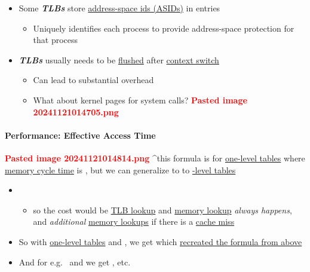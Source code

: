 \begin{itemize}
\tightlist
\item
  Some \textbf{\textit{TLBs}} store \ul{address-space ids (ASIDs)} in
  entries

  \begin{itemize}
  \tightlist
  \item
    Uniquely identifies each process to provide address-space protection
    for that process
  \end{itemize}
\item
  \textbf{\textit{TLBs}} usually needs to be \ul{flushed} after
  \ul{context switch}

  \begin{itemize}
  \tightlist
  \item
    Can lead to substantial overhead
  \item
    What about kernel pages for system calls?
    \textcolor{red}{\textbf{Pasted image 20241121014705.png}}
  \end{itemize}
\end{itemize}

\paragraph*{Performance: Effective Access Time}

\textcolor{red}{\textbf{Pasted image 20241121014814.png}} \^{}this
formula is for \ul{one-level tables} where \ul{memory cycle time}
 is , but we can generalize to to
\ul{-level tables}

\begin{itemize}
\tightlist
\item

  \begin{itemize}
  \tightlist
  \item
    so the cost would be  \ul{TLB lookup} and 
    \ul{memory lookup} \textit{always happens}, and 
    \textit{additional} \ul{memory lookups} if there is a \ul{cache
    miss}
  \end{itemize}
\item
  So with \ul{one-level tables}  and , we get
   which \ul{recreated the formula
  from above}
\item
  And for e.g.~ and  we get
  , etc.
\end{itemize}

